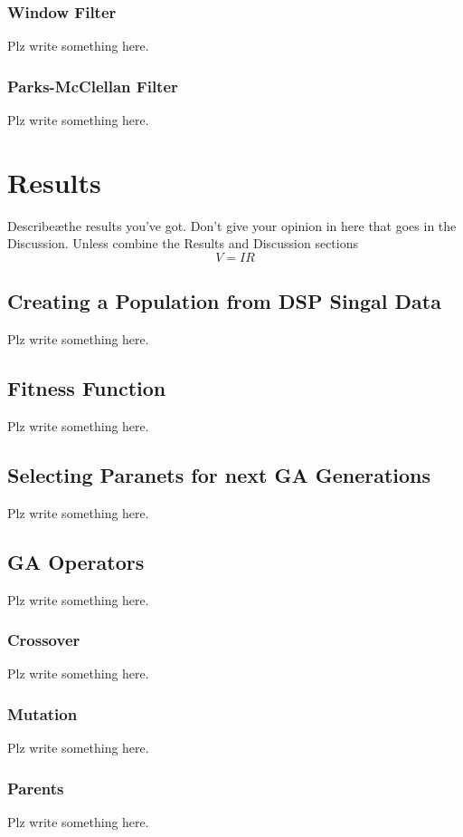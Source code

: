 \documentclass[a4paper, 11pt]{article}
\begin{document}
        \subsubsection{Window Filter}
            Plz write something here.
        \subsubsection{Parks-McClellan Filter}
            Plz write something here.

\section{Results}\label{sec:res}
    Describe\ae the results you've got. Don't give your opinion in here that goes in the Discussion.
    Unless combine the Results and Discussion sections \begin{equation} V = IR\end{equation}

    \subsection{Creating a Population from DSP Singal Data}\label{sec:meth_sub1}
    Plz write something here.
\subsection{Fitness Function}\label{sec:meth_sub2}
    Plz write something here.
\subsection{Selecting Paranets for next GA Generations}\label{sec:meth_sub3}
    Plz write something here.
\subsection{GA Operators}\label{sec:meth_sub4}
    Plz write something here.
    \subsubsection{Crossover}
        Plz write something here.
    \subsubsection{Mutation}
        Plz write something here.
    \subsubsection{Parents}
        Plz write something here.
\end{document}
